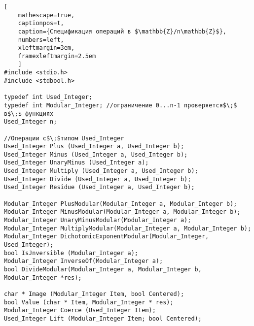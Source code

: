     \newpage
    \begin{lstlisting}[
    mathescape=true,
    captionpos=t,
    caption={Спецификация операций в $\mathbb{Z}/n\mathbb{Z}$},
    numbers=left,
    xleftmargin=3em,
    framexleftmargin=2.5em
    ]
#include <stdio.h>
#include <stdbool.h>

typedef int Used_Integer;
typedef int Modular_Integer; //ограничение 0...n-1 проверяется$\;$ в$\;$ функциях
Used_Integer n;

//Операции с$\;$типом Used_Integer
Used_Integer Plus (Used_Integer a, Used_Integer b);
Used_Integer Minus (Used_Integer a, Used_Integer b);
Used_Integer UnaryMinus (Used_Integer a);
Used_Integer Multiply (Used_Integer a, Used_Integer b);
Used_Integer Divide (Used_Integer a, Used_Integer b);
Used_Integer Residue (Used_Integer a, Used_Integer b);

Modular_Integer PlusModular(Modular_Integer a, Modular_Integer b);
Modular_Integer MinusModular(Modular_Integer a, Modular_Integer b);
Modular_Integer UnaryMinusModular(Modular_Integer a);
Modular_Integer MultiplyModular(Modular_Integer a, Modular_Integer b);
Modular_Integer DichotomicExponentModular(Modular_Integer, Used_Integer);
bool IsJnversible (Modular_Integer a);
Modular_Integer InverseOf(Modular_Integer a);
bool DivideModular(Modular_Integer a, Modular_Integer b, Modular_Integer *res);

char * Image (Modular_Integer Item, bool Centered);
bool Value (char * Item, Modular_Integer * res);
Modular_Integer Coerce (Used_Integer Item);
Used_Integer Lift (Modular_Integer Item; bool Centered);

\end{lstlisting}

